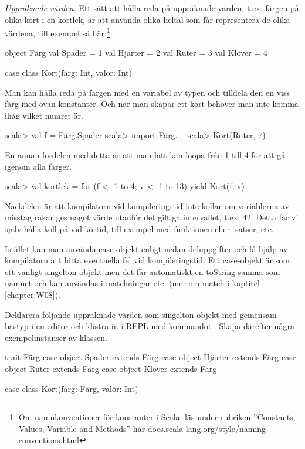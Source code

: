 \Task \emph{Uppräknade värden.} Ett sätt att hålla reda på uppräknade värden, t.ex. färgen på olika kort i en kortlek, är att använda olika heltal som får representera de olika värdena, till exempel så här:\footnote{Om namnkonventioner för konstanter i Scala: läs under rubriken ''Constants, Values, Variable and Methods'' här \href{http://docs.scala-lang.org/style/naming-conventions.html}{docs.scala-lang.org/style/naming-conventions.html}} 
\begin{Code}
object Färg {
  val Spader = 1
  val Hjärter = 2
  val Ruter = 3
  val Klöver = 4
}

case class Kort(färg: Int, valör: Int)
\end{Code}
Man kan hålla reda på färgen med en variabel av typen  och tilldela den en viss färg med ovan konstanter. Och när man skapar ett kort behöver man inte komma ihåg vilket numret är.
\begin{REPL}
scala> val f = Färg.Spader
scala> import Färg._
scala> Kort(Ruter, 7)
\end{REPL}
En annan fördelen med detta är att man lätt kan loopa från 1 till 4 för att gå igenom alla färger. 
\begin{REPL}
scala> val kortlek = for (f <- 1 to 4; v <- 1 to 13) yield Kort(f, v)
\end{REPL}
Nackdelen är att kompilatorn vid kompileringstid inte kollar om variablerna av misstag råkar ges något värde utanför det giltiga intervallet, t.ex. 42. Detta får vi själv hålla koll på vid körtid, till exempel med funktionen  eller -satser, etc.

Istället kan man använda case-objekt enligt nedan deluppgifter och få hjälp av kompilatorn att hitta eventuella fel vid kompileringstid.  Ett case-objekt är som ett vanligt singelton-objekt men det får automatiskt en toString samma som namnet och kan användas i matchningar etc. (mer om match i kaptitel \ref{chapter:W08}). 

\Subtask Deklarera följande uppräknade värden som singelton objekt med gemensam bastyp i en editor och klistra in i REPL med kommandot . Skapa därefter några exempelinstanser av klassen. .
\begin{Code}
trait Färg
case object Spader extends Färg
case object Hjärter extends Färg
case object Ruter extends Färg
case object Klöver extends Färg

case class Kort(färg: Färg, valör: Int)
\end{Code}

